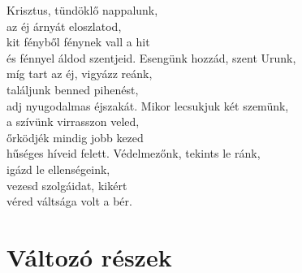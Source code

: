 \documentclass[twoside]{article}
\begin{document}
\begin{hymnstanzas}
    Krisztus, tündöklő nappalunk,\\
    az éj árnyát eloszlatod,\\
    kit fényből fénynek vall a hit\\
    és fénnyel áldod szentjeid.
\stanzabreak
    Esengünk hozzád, szent Urunk, \\
    míg tart az éj, vigyázz reánk, \\
    találjunk benned pihenést, \\
    adj nyugodalmas éjszakát.
\stanzabreak
    Mikor lecsukjuk két szemünk, \\
    a szívünk virrasszon veled, \\
    őrködjék mindig jobb kezed \\
    hűséges híveid felett.
\stanzabreak
    Védelmezőnk, tekints le ránk, \\
    igázd le ellenségeink, \\
    vezesd szolgáidat, kikért \\
    véred váltsága volt a bér.
\end{hymnstanzas}














\section*{Változó részek}
\end{document}
